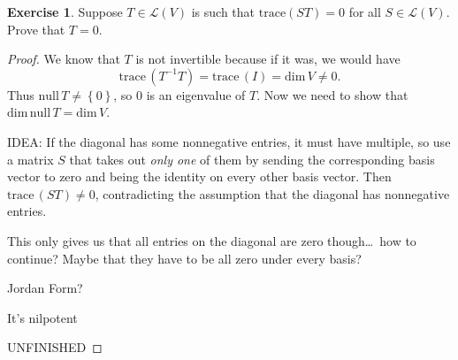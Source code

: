 \documentclass{article}
\theoremstyle{definition}
\newtheorem{ex}{Exercise}
\begin{document}
\begin{ex}
	Suppose $T \in \mathcal{L}(V)$ is such that $\mathrm{trace}(ST) = 0$ for all $S \in \mathcal{L}(V)$.
	Prove that $T = 0$.
\end{ex}
\begin{proof}
	We know that $T$ is not invertible because if it was, we would have \begin{equation*}
		\mathrm{trace}\,(T^{-1}T) = \mathrm{trace}\,(I) = \mathrm{dim}\,V \neq 0.
	\end{equation*}
	Thus $\mathrm{null}\,T \ne \left\lbrace 0 \right\rbrace$, so $0$ is an eigenvalue of $T$.
	Now we need to show that $\mathrm{dim}\,\mathrm{null}\,T = \mathrm{dim}\,V$.

	IDEA: If the diagonal has some nonnegative entries, it must have multiple, so use a matrix $S$ that takes out \textit{only one} of them by sending the corresponding basis vector to zero and being the identity on every other basis vector. Then $\mathrm{trace}\,(ST) \neq 0$, contradicting the assumption that the diagonal has nonnegative entries.

	This only gives us that all entries on the diagonal are zero though\dots\ how to continue? Maybe that they have to be all zero under every basis?

	Jordan Form?

	It's nilpotent

	UNFINISHED
\end{proof}
\end{document}
